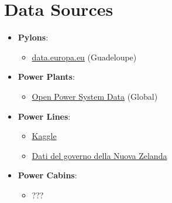 \section*{Data Sources}
\begin{itemize}
    \item \textbf{Pylons}: \begin{itemize}
        \item \href{https://data.europa.eu/data/datasets/60240e4c78071650197ce5a4?locale=en}{data.europa.eu} (Guadeloupe)
    \end{itemize}

    \item \textbf{Power Plants}: \begin{itemize}
        \item \href{https://doi.org/10.25832/renewable_power_plants/2020-08-25}{Open Power System Data} (Global)
    \end{itemize}

    \item \textbf{Power Lines}: \begin{itemize}
        \item \href{https://www.kaggle.com/}{Kaggle}
        \item \href{https://data.govt.nz}{Dati del governo della Nuova Zelanda}
    \end{itemize}

    \item \textbf{Power Cabins}: \begin{itemize}
        \item ???
    \end{itemize}
\end{itemize}